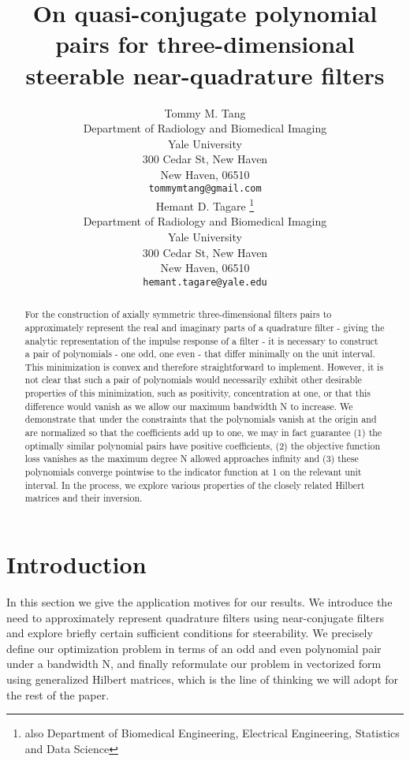 \documentclass{article}
\title{On quasi-conjugate polynomial pairs for three-dimensional steerable near-quadrature filters}
\author{
 Tommy M. Tang  \\
  Department of Radiology and Biomedical Imaging\\
  Yale University\\
   300 Cedar St, New Haven\\
  New Haven, 06510 \\
  \texttt{tommymtang@gmail.com} \\
   \And
 Hemant D. Tagare \thanks{also Department of Biomedical Engineering, Electrical Engineering, Statistics and Data Science} \\
 Department of Radiology and Biomedical Imaging\\
 Yale University\\
 300 Cedar St, New Haven\\
  New Haven, 06510 \\
  \texttt{hemant.tagare@yale.edu} \\
}
\theoremstyle{definition}
\theoremstyle{remark}
\numberwithin{equation}{section}
\begin{document}
\maketitle

\begin{abstract}
For the construction of axially symmetric three-dimensional filters pairs to approximately represent the real and imaginary parts of a quadrature filter - giving the analytic representation of the impulse response of a filter - it is necessary to construct a pair of polynomials - one odd, one even - that differ minimally on the unit interval. This minimization is convex and therefore straightforward to implement. However, it is not clear that such a pair of polynomials would necessarily exhibit other desirable properties of this minimization, such as positivity, concentration at one, or that this difference would vanish as we allow our maximum bandwidth N to increase. We demonstrate that under the constraints that the polynomials vanish at the origin and are normalized so that the coefficients add up to one, we may in fact guarantee (1) the optimally similar polynomial pairs have positive coefficients, (2) the objective function loss vanishes as the maximum degree N allowed approaches infinity and (3) these polynomials converge pointwise to the indicator function at 1 on the relevant unit interval. In the process, we explore various properties of the closely related Hilbert matrices and their inversion. 
\end{abstract}




\section{Introduction}
\label{Introduction}
In this section we give the application motives for our results. We introduce the need to approximately represent quadrature filters using near-conjugate filters and explore briefly certain sufficient conditions for steerability. We precisely define our optimization problem in terms of an odd and even polynomial pair under a bandwidth N, and finally reformulate our problem in vectorized form using generalized Hilbert matrices, which is the line of thinking we will adopt for the rest of the paper. 
\end{document}
